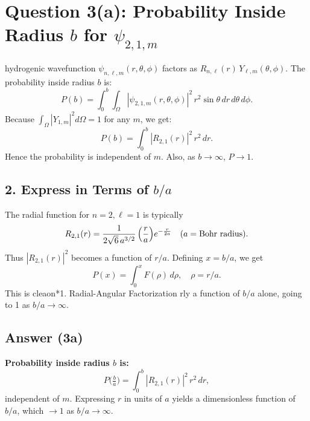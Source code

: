 \documentclass[12pt]{article}
\begin{document}
\section*{Question 3(a): Probability Inside Radius $b$ for $\psi_{2,1,m}$}

\subsectiThe hydrogenic wavefunction $\psi_{n,\ell,m}(r,\theta,\phi)$ factors as $R_{n,\ell}(r)\,Y_{\ell,m}(\theta,\phi)$. The probability inside radius $b$ is:
\begin{equation}
P(b) = \int_0^b \int_{\Omega} |\psi_{2,1,m}(r,\theta,\phi)|^2\,r^2\sin\theta\,dr\,d\theta\,d\phi.
\end{equation}
Because $\int_{\Omega} |Y_{1,m}|^2 d\Omega = 1$ for any $m$, we get:
\begin{equation}
P(b) = \int_0^b |R_{2,1}(r)|^2\,r^2\,dr.
\end{equation}
Hence the probability is independent of $m$. Also, as $b\to\infty$, $P\to1$.

\subsection*{2. Express in Terms of $b/a$}
The radial function for $n=2,\ell=1$ is typically
\begin{equation}
R_{2,1}(r) = \frac{1}{2\sqrt{6}\,a^{3/2}}\,\Bigl(\frac{r}{a}\Bigr) e^{-\frac{r}{2a}} \quad (a=\text{Bohr radius}).
\end{equation}
Thus $|R_{2,1}(r)|^2$ becomes a function of $r/a$. Defining $x=b/a$, we get
\begin{equation}
P(x) = \int_0^x F(\rho)\,d\rho,\quad \rho = r/a.
\end{equation}
This is cleaon*{1. Radial-Angular Factorization}
rly a function of $b/a$ alone, going to 1 as $b/a\to\infty$.

\subsection*{Answer (3a)}
\textbf{Probability inside radius $b$ is:}
\begin{equation}
P\bigl(\tfrac{b}{a}\bigr) = \int_0^{b} |R_{2,1}(r)|^2\,r^2\,dr,
\end{equation}
independent of $m$. Expressing $r$ in units of $a$ yields a dimensionless function of $b/a$, which $\to1$ as $b/a\to\infty$.
\end{document}

